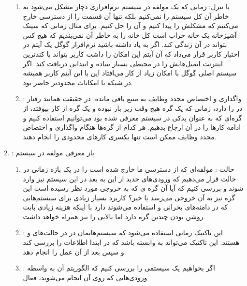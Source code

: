 \begin{enumerate}
\begin{enumerate}
        \item {} یا تنزل: زمانی که یک مولفه در سیستم نرم‌افزاری
        دچار مشکل می‌شود به خاطر آن کل سیستم را  نمی‌کنیم
        بلکه تنها آن قسمت را از دسترسی خارج می‌کنیم که مشکلش را پیدا کنیم و آن
        را حل کنیم. برای مثال زمانی که سینک آشپزخانه یک خانه خراب است کل خانه را
        به خاطر آن نمی‌بندیم که هیچ کس نتواند در آن زندگی کند. اگر به یاد داشته
        باشید نرم‌افزار  گوگل یک آیتم در اختیار کاربر قرار می‌داد که
        آن آیتم این امکان را داشت کاربر بتواند با کندترین اینترنت ایمیل‌هایش را
        در محیطی بسیار ساده و ابتدایی دریافت کند. اگر سیستم اصلی گوگل با امکان
        زیاد از کار می‌افتاد این با این آیتم کاربر همیشه در شبکه با امکانات
        محدودتر حاضر بود.
        \item {}: واگذاری و اختصاص مجدد وظایف به منبع باقی
        مانده. در حقیقت همانند رفتار در  را دارد، زمانی که یک گره هیچ
        وقت زیر بار نبوده و یک گره  از کار بیوفتد، از گره‌ای که به
        عنوان یدکی در سیستم معرفی شده بود می‌توانیم استفاده کنیم و ادامه کار‌ها
        را در آن ارجاع بدهیم. هر کدام از گره‌ها هنگام واگذاری و اختصاص مجدد
        وظایف ممکن است تنها یکسری کار‌های محدودی را انجام دهند.
    \end{enumerate}
    \item {}: باز معرفی مولفه در سیستم
    \begin{enumerate}
        \item حالت : مولفه‌ای که از دسترسی ما خارج شده است را در یک
        بازه زمانی در حالت  قرار می‌دهیم که ورودی‌های جدید از این به
        بعد در این سیستم نیز وارد شوند و بررسی کنیم که آیا آن گره ی
        که به خروجی مورد نظر رسیده است این گره نیز به آن خروجی می‌رسد یا خیر؟
        کاربرد بسیار زیادی برای سیستم‌هایی که در دامنه‌های بحرانی و
         استفاده می‌شوند دارد با اینکه هزینه زیادی بابت روشن بودن
        چندین گره دارد اما  بالایی را نیز همراه خواهد داشت.
        \item {}: این تاکتیک زمانی استفاده می‌شود که سیستم‌هایمان
        در  در حالت‌های  و  هستند. این تاکتیک می‌تواند به  وابسته باشد که
        در ابتدا اطلاعات را بررسی کند و سپس بعد از آن عمل  را انجام
        دهد.
        \item {}: اگر بخواهیم یک سیستمی را بررسی
        کنیم که الگوریتم آن به واسطه ورودی‌هایی که روی آن انجام می‌شوند، فعال

\end{enumerate}
\end{enumerate}
